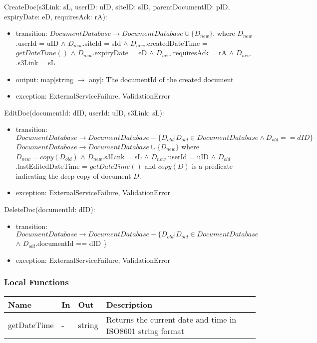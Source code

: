 \documentclass[12pt, titlepage]{article}
\begin{document}
{    \noindent CreateDoc(s3Link: sL, userID: uID, siteID: sID,
      parentDocumentID: pID,
    expiryDate: eD, requiresAck: rA):
    \begin{itemize}
      \item transition: $DocumentDatabase \rightarrow DocumentDatabase
        \cup \{D_{new}\}$, where $D_{new}$.userId = uID $\land$
        $D_{new}$.siteId =
        sId $\land$ $D_{new}$.createdDateTime = $getDateTime()$ $\land$
        $D_{new}$.expiryDate = eD $\land$
        $D_{new}$.requiresAck = rA $\land$ $D_{new}$.s3Link = sL
      \item output: map[string $\rightarrow$ any]: The documentId of the created
        document
      \item exception: ExternalServiceFailure, ValidationError
    \end{itemize}

    \noindent EditDoc(documentId: dID, userId: uID, s3Link: sL):
    \begin{itemize}
      \item transition: $DocumentDatabase \rightarrow
        DocumentDatabase - \{D_{old}
        | D_{old} \in DocumentDatabase \land D_{old} == dID\}$\\
        $DocumentDatabase \rightarrow DocumentDatabase \cup
        \{D_{new}\}$ where $D_{new} = copy(D_{old})$ $\land$
        $D_{new}$.s3Link = sL
        $\land$ $D_{new}$.userId = uID $\land$
        $D_{old}$.lastEditedDateTime = $getDateTime()$ and $copy(D)$ is
        a predicate indicating the
        deep copy of document $D$.
      \item exception: ExternalServiceFailure, ValidationError
    \end{itemize}

    \noindent DeleteDoc(documentId: dID):
    \begin{itemize}
      \item transition: $DocumentDatabase \rightarrow DocumentDatabase -
        \{D_{old} | D_{old} \in DocumentDatabase$ $\land$
        $D_{old}$.documentId == dID \}
      \item exception: ExternalServiceFailure, ValidationError
    \end{itemize}

    \subsubsection{Local Functions}

    \begin{center}
      \begin{tabular}{>{\raggedright}p{4cm} >{\raggedright}p{3cm}
        >{\raggedright}p{3.5cm} p{5.5cm}}
        \hline
        \textbf{Name} & \textbf{In} & \textbf{Out} & \textbf{Description} \\
        \hline
        getDateTime & - & string & Returns the current date and time in ISO8601
        string format\\
        \hline
      \end{tabular}
    \end{center}

}
\end{document}
